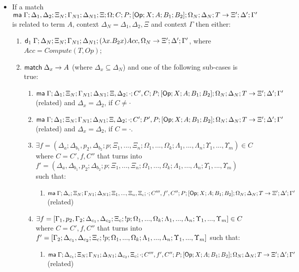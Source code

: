 \begin{theorem}
   \begin{itemize}
      \item If a match $\mathsf{ma} \; \Gamma; \Delta_1, \Delta_2; \Xi_N; \Gamma_{N1}; \Delta_{N1}; \Xi; \Omega; C; P; [\mathsf{Op} ; X ; A ; B_1; B_2]; \Omega_N; \Delta_N; T \rightarrow \Xi'; \Delta'; \Gamma'$ is related to term $A$, context $\Delta_N = \Delta_1, \Delta_2, \Xi$ and context $\Gamma$ then either:
      \begin{enumerate}
         \item $\mathsf{d}_1 \; \Gamma; \Delta_N; \Xi_N; \Gamma_{N1}; \Delta_{N1}; (\lambda x. B_2 x)Acc, \Omega_N \rightarrow \Xi'; \Delta'; \Gamma'$, where $Acc = Compute(T, Op)$;
         \item $\mathsf{match} \; \Delta_x \rightarrow A$ (where $\Delta_x \subseteq \Delta_N$) and one of the following sub-cases is true:
         \begin{enumerate}
            \item $\mathsf{ma} \; \Gamma; \Delta_1; \Xi_N; \Gamma_{N1}; \Delta_{N1}; \Xi, \Delta_2; \cdot; C', C; P; [\mathsf{Op} ; X ; A ; B_1; B_2]; \Omega_N; \Delta_N; T \rightarrow \Xi'; \Delta'; \Gamma'$ (related) and $\Delta_x = \Delta_2$, if $C \neq \cdot$
            \item $\mathsf{ma} \; \Gamma; \Delta_1; \Xi_N; \Gamma_{N1}; \Delta_{N1}; \Xi, \Delta_2; \cdot; C'; P', P; [\mathsf{Op} ; X ; A ; B_1; B_2]; \Omega_N; \Delta_N; T \rightarrow \Xi'; \Delta'; \Gamma'$ (related) and $\Delta_x = \Delta_2$, if $C = \cdot$.
            \item $\exists f = (\Delta_a; \Delta_{b_1}, p_2, \Delta_{b_2}; p; \Xi_1, ..., \Xi_n; \Omega_1, ..., \Omega_k; \Lambda_1, ..., \Lambda_n; \Upsilon_1, ..., \Upsilon_m) \in C$ where $C = C', f, C''$ that turns into $f' = (\Delta_a, \Delta_{b_1}, p_2; \Delta_{b_2}; p; \Xi_1, ..., \Xi_n; \Omega_1, ..., \Omega_k; \Lambda_1, ..., \Lambda_n; \Upsilon_1, ..., \Upsilon_m)$ such that:
               \begin{enumerate}
                  \item $\mathsf{ma} \; \Gamma; \Delta_c; \Xi_N; \Gamma_{N1}; \Delta_{N1}; \Xi_1, ..., \Xi_n, \Xi_c; \cdot; C''', f', C''; P; [\mathsf{Op} ; X ; A ; B_1; B_2]; \Omega_N; \Delta_N; T \rightarrow \Xi'; \Delta'; \Gamma'$ (related)
               \end{enumerate}
               
            \item $\exists f = [\Gamma_1, p_2, \Gamma_2; \Delta_{c_1}, \Delta_{c_2}; \Xi_c; {!} p; \Omega_1, ..., \Omega_k; \Lambda_1, ..., \Lambda_n; \Upsilon_1, ..., \Upsilon_m] \in C$ where $C = C', f, C''$ that turns into $f' = [\Gamma_2; \Delta_{c_1}, \Delta_{c_2}; \Xi_c; {!} p; \Omega_1, ..., \Omega_k; \Lambda_1, ..., \Lambda_n; \Upsilon_1, ..., \Upsilon_m]$ such that:
               \begin{enumerate}
                  \item $\mathsf{ma} \; \Gamma; \Delta_{c_1}; \Xi_N; \Gamma_{N1}; \Delta_{N1}; \Delta_{c_2}, \Xi_c; \cdot; C''', f', C''; P; [\mathsf{Op} ; X ; A ; B_1; B_2]; \Omega_N; \Delta_N; T \rightarrow \Xi'; \Delta'; \Gamma'$ (related)
               \end{enumerate}
               

\end{enumerate}
\end{enumerate}
\end{itemize}
\end{theorem}
